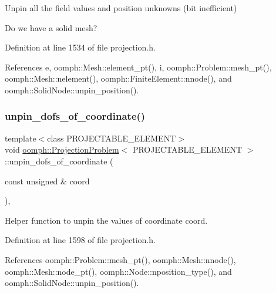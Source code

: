 Unpin all the field values and position unknowns (bit inefficient) 

Do we have a solid mesh? 

Definition at line 1534 of file projection.\+h.



References e, oomph\+::\+Mesh\+::element\+\_\+pt(), i, oomph\+::\+Problem\+::mesh\+\_\+pt(), oomph\+::\+Mesh\+::nelement(), oomph\+::\+Finite\+Element\+::nnode(), and oomph\+::\+Solid\+Node\+::unpin\+\_\+position().

\mbox{\label{classoomph_1_1ProjectionProblem_a50b3643c4e6942755e1ede1c0ab417ec}} 
\subsubsection{\texorpdfstring{unpin\+\_\+dofs\+\_\+of\+\_\+coordinate()}{unpin\_dofs\_of\_coordinate()}}
{\footnotesize\ttfamily template$<$class P\+R\+O\+J\+E\+C\+T\+A\+B\+L\+E\+\_\+\+E\+L\+E\+M\+E\+NT$>$ \\
void \hyperlink{classoomph_1_1ProjectionProblem}{oomph\+::\+Projection\+Problem}$<$ P\+R\+O\+J\+E\+C\+T\+A\+B\+L\+E\+\_\+\+E\+L\+E\+M\+E\+NT $>$\+::unpin\+\_\+dofs\+\_\+of\+\_\+coordinate (\begin{DoxyParamCaption}\item[{const unsigned \&}]{coord }\end{DoxyParamCaption})\hspace{0.3cm}{\ttfamily [inline]}, {\ttfamily [private]}}



Helper function to unpin the values of coordinate coord. 



Definition at line 1598 of file projection.\+h.



References oomph\+::\+Problem\+::mesh\+\_\+pt(), oomph\+::\+Mesh\+::nnode(), oomph\+::\+Mesh\+::node\+\_\+pt(), oomph\+::\+Node\+::nposition\+\_\+type(), and oomph\+::\+Solid\+Node\+::unpin\+\_\+position().

\mbox{\label{classoomph_1_1ProjectionProblem_a36847f48bff4081b5db0c038ddba1260}} 
